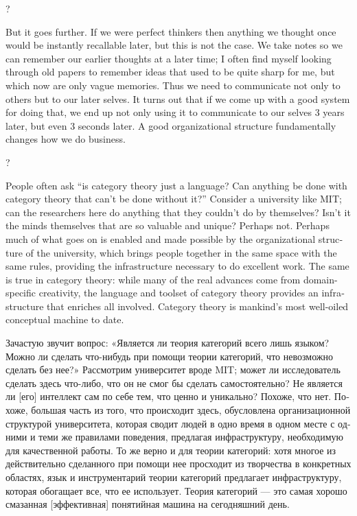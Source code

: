 \documentclass{book}
\theoremstyle{theoremENG}
\theoremstyle{lemmaENG}
\theoremstyle{propositionENG}
\theoremstyle{corollaryENG}
\theoremstyle{factENG}
\theoremstyle{remarkENG}
\theoremstyle{exampleENG}
\theoremstyle{warningENG}
\theoremstyle{questionENG}
\theoremstyle{guessENG}
\theoremstyle{answerENG}
\theoremstyle{constructionENG}
\theoremstyle{rulesENG}
\theoremstyle{excENG}
\theoremstyle{appENG}
\theoremstyle{definitionENG}
\theoremstyle{notationENG}
\theoremstyle{conjectureENG}
\theoremstyle{postulateENG}
\theoremstyle{theoremRUS}
\theoremstyle{lemmaRUS}
\theoremstyle{propositionRUS}
\theoremstyle{corollaryRUS}
\theoremstyle{factRUS}
\theoremstyle{remarkRUS}
\theoremstyle{exampleRUS}
\theoremstyle{warningRUS}
\theoremstyle{questionRUS}
\theoremstyle{guessRUS}
\theoremstyle{answerRUS}
\theoremstyle{constructionRUS}
\theoremstyle{rulesRUS}
\theoremstyle{excRUS}
\theoremstyle{appRUS}
\theoremstyle{definitionRUS}
\theoremstyle{notationRUS}
\theoremstyle{conjectureRUS}
\theoremstyle{postulateRUS}
\begin{document}
\begin{english}
\begin{russian}? \end{russian}

But it goes further. If we were perfect thinkers then anything we thought once would be instantly recallable later, but this is not the case. We take notes so we can remember our earlier thoughts at a later time; I often find myself looking through old papers to remember ideas that used to be quite sharp for me, but which now are only vague memories. Thus we need to communicate not only to others but to our later selves. It turns out that if we come up with a good system for doing that, we end up not only using it to communicate to our selves 3 years later, but even 3 seconds later. A good organizational structure fundamentally changes how we do business.

\begin{russian}? \end{russian}

People often ask “is category theory just a language? Can anything be done with category theory that can't be done without it?” Consider a university like MIT; can the researchers here do anything that they couldn't do by themselves? Isn't it the minds themselves that are so valuable and unique? Perhaps not. Perhaps much of what goes on is enabled and made possible by the organizational structure of the university, which brings people together in the same space with the same rules, providing the  infrastructure necessary to do excellent work. The same is true in category theory: while many of the real advances come from domain-specific creativity, the language and toolset of category theory provides an infrastructure that enriches all involved. Category theory is mankind's most well-oiled conceptual machine to date.

\begin{russian}Зачастую звучит вопрос: «Является ли теория категорий всего лишь языком? Можно ли сделать что-нибудь при помощи теории категорий, что невозможно сделать без нее?» Рассмотрим университет вроде MIT; может ли исследователь сделать здесь что-либо, что он не смог бы сделать самостоятельно? Не является ли [его] интеллект сам по себе тем, что ценно и уникально? Похоже, что нет. Похоже, большая часть из того, что происходит здесь, обусловлена организационной структурой университета, которая сводит людей в одно время в одном месте с одними и теми же правилами поведения, предлагая инфраструктуру, необходимую для качественной работы. То же верно и для теории категорий: хотя многое из действительно сделанного при помощи нее просходит из творчества в конкретных областях, язык и инструментарий теории категорий предлагает инфраструктуру, которая обогащает все, что ее использует. Теория категорий — это самая хорошо смазанная [эффективная] понятийная машина на сегодняшний день. \end{russian}


\end{english}
\end{document}
